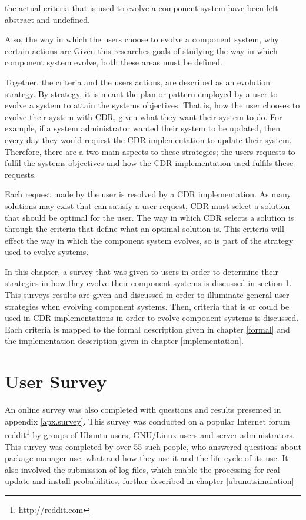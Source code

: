 the actual criteria that is used to evolve a component system have been left abstract and undefined.

Also, the way in which the users choose to evolve a component system, why certain actions are 
Given this researches goals of studying the way in which component system evolve, both these areas must be defined.

Together, the criteria and the users actions, are described as an evolution strategy.
By strategy, it is meant the plan or pattern employed by a user to evolve a system to attain the systems objectives.
That is, how the user chooses to evolve their system with CDR, given what they want their system to do.
For example, if a system administrator wanted their system to be updated, then every day they would request the CDR implementation to update their system.
Therefore, there are a two main aspects to these strategies; 
the users requests to fulfil the systems objectives and how the CDR implementation used fulfils these requests.  



Each request made by the user is resolved by a CDR implementation.
As many solutions may exist that can satisfy a user request, CDR must select a solution that should be optimal for the user.
The way in which CDR selects a solution is through the criteria that define what an optimal solution is.
This criteria will effect the way in which the component system evolves, so is part of the strategy used to evolve systems.

In this chapter, a survey that was given to users in order to determine their strategies in how they evolve their component systems is discussed in section \ref{strat.usersurvey}.
This surveys results are given and discussed in order to illuminate general user strategies when evolving component systems.
Then, criteria that is or could be used in CDR implementations in order to evolve component systems is discussed.
Each criteria is mapped to the formal description given in chapter \ref{formal} and the implementation description given in chapter \ref{implementation}.

\section{User Survey}
\label{strat.usersurvey}
An online survey was also completed with questions and results presented in appendix \ref{apx.survey}.
This survey was conducted on a popular Internet forum reddit\footnote{http://reddit.com} by groups of Ubuntu users, GNU/Linux users and server administrators.
This survey was completed by over 55 such people, who answered questions about package manager use, what and how they use it and the life cycle of its use.
It also involved the submission of log files, which enable the processing for real update and install probabilities, further described in chapter \ref{ubunutsimulation}


